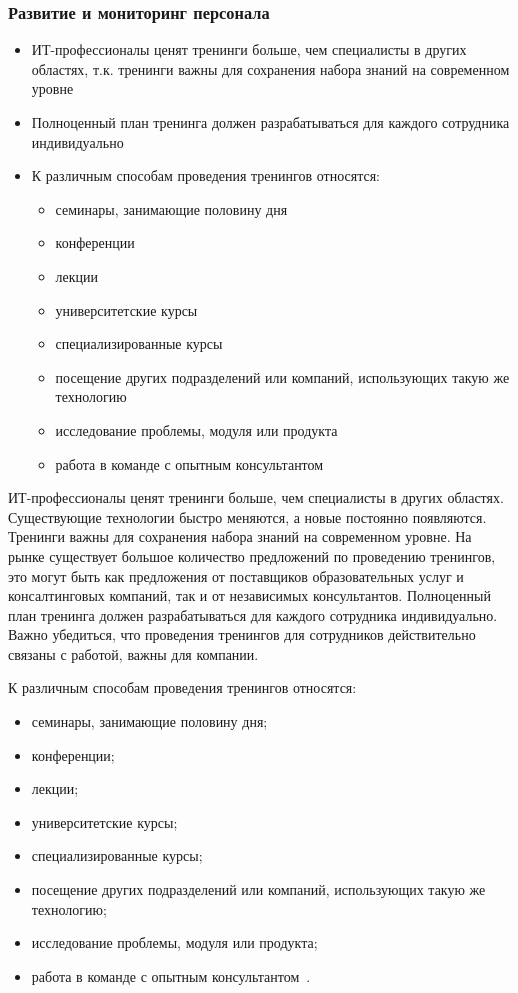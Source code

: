 \documentclass{../industrial-development}
\begin{document}

\begin{frame} \frametitle{Развитие и мониторинг персонала}
  \begin{itemize}
		\item ИТ-профессионалы ценят тренинги больше, чем специалисты в других областях, т.к. тренинги важны для сохранения набора знаний на современном уровне 
		\item Полноценный план тренинга должен разрабатываться для каждого сотрудника индивидуально 
		\item К различным способам проведения тренингов относятся: 
		  \begin{itemize}
\item	семинары, занимающие половину дня
\item конференции
\item лекции
\item университетские курсы
\item специализированные курсы	
\item посещение других подразделений или компаний, использующих такую же технологию
\item исследование проблемы, модуля или продукта
\item работа в команде с опытным консультантом
  \end{itemize}

  \end{itemize}
\end{frame}

\lecturenotes

ИТ-профессионалы ценят тренинги больше, чем специалисты в других областях. Существующие технологии быстро меняются, а новые постоянно появляются. Тренинги важны для сохранения набора знаний на современном уровне. На рынке существует большое количество предложений по проведению тренингов, это могут быть как предложения от поставщиков образовательных услуг и консалтинговых компаний, так и от независимых консультантов. Полноценный план тренинга должен разрабатываться для каждого сотрудника индивидуально. Важно убедиться, что проведения тренингов для сотрудников действительно связаны с работой, важны для компании. 

К различным способам проведения тренингов относятся: 
  \begin{itemize}
\item	семинары, занимающие половину дня;
\item	конференции;
\item	лекции;
\item	университетские курсы;
\item	специализированные курсы;
\item	посещение других подразделений или компаний, использующих такую же технологию;
\item	исследование проблемы, модуля или продукта;
\item	работа в команде с опытным консультантом~\cite[с.~257--259]{Lein}.
  \end{itemize}
\end{document}
